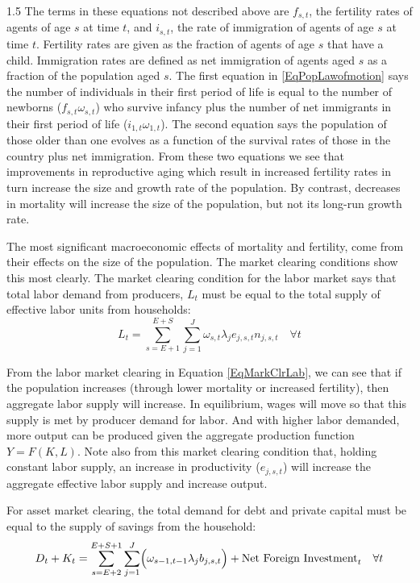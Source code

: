 \documentclass[letterpaper,12pt]{article}
\theoremstyle{definition}
\begin{document}
\begin{spacing}{1.5}
    The terms in these equations not described above are $f_{s,t}$, the fertility rates of agents of age $s$ at time $t$, and $i_{s,t}$, the rate of immigration of agents of age $s$ at time $t$. Fertility rates are given as the fraction of agents of age $s$ that have a child. Immigration rates are defined as net immigration of agents aged $s$ as a fraction of the population aged $s$. The first equation in \eqref{EqPopLawofmotion} says the number of individuals in their first period of life is equal to the number of newborns ($f_{s,t}\omega_{s,t}$) who survive infancy plus the number of net immigrants in their first period of life ($i_{1,t}\omega_{1,t}$). The second equation says the population of those older than one evolves as a function of the survival rates of those in the country plus net immigration. From these two equations we see that improvements in reproductive aging which result in increased fertility rates in turn increase the size and growth rate of the population. By contrast, decreases in mortality will increase the size of the population, but not its long-run growth rate.

    The most significant macroeconomic effects of mortality and fertility, come from their effects on the size of the population.  The market clearing conditions show this most clearly.  The market clearing condition for the labor market says that total labor demand from producers, $L_{t}$ must be equal to the total supply of effective labor units from households:
    \begin{equation}\label{EqMarkClrLab}
      L_{t} = \sum_{s=E+1}^{E+S}\sum_{j=1}^{J} \omega_{s,t}\lambda_j e_{j,s,t}n_{j,s,t} \quad \forall t
    \end{equation}

    From the labor market clearing in Equation \eqref{EqMarkClrLab}, we can see that if the population increases (through lower mortality or increased fertility), then aggregate labor supply will increase.  In equilibrium, wages will move so that this supply is met by producer demand for labor. And with higher labor demanded, more output can be produced given the aggregate production function $Y = F(K,L)$.  Note also from this market clearing condition that, holding constant labor supply, an increase in productivity ($e_{j,s,t}$) will increase the aggregate effective labor supply and increase output.

    For asset market clearing, the total demand for debt and private capital must be equal to the supply of savings from the household:
    \begin{equation}\label{EqMarkClr_Bt}
      D_{t} + K_{t} = \sum_{s=E+2}^{E+S+1}\sum_{j=1}^{J}\Bigl(\omega_{s-1,t-1}\lambda_j b_{j,s,t}\Bigr) + \text{Net Foreign Investment}_t \quad \forall t
    \end{equation}


\end{spacing}
\end{document}
